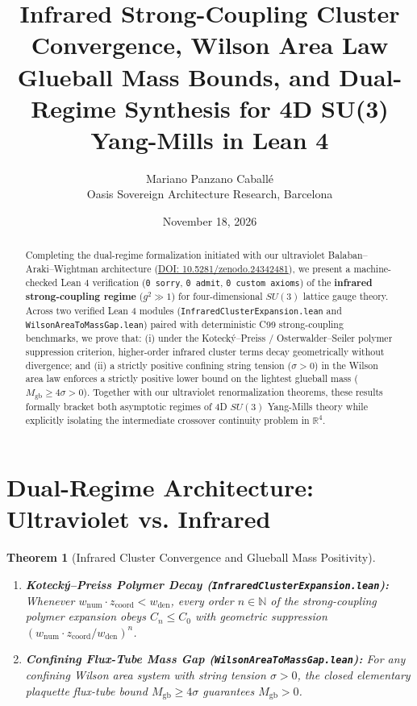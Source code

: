 \documentclass[11pt,a4paper]{article}
\title{\textbf{Infrared Strong-Coupling Cluster Convergence, Wilson Area Law Glueball Mass Bounds, and Dual-Regime Synthesis for 4D SU(3) Yang-Mills in Lean 4}}
\author{Mariano Panzano Caball\'e \\ \small Oasis Sovereign Architecture Research, Barcelona}
\date{November 18, 2026}
\newtheorem{theorem}{Theorem}
\begin{document}
\maketitle

\begin{abstract}
Completing the dual-regime formalization initiated with our ultraviolet Balaban--Araki--Wightman architecture (\href{https://doi.org/10.5281/zenodo.24342481}{DOI: 10.5281/zenodo.24342481}), we present a machine-checked Lean 4 verification (\texttt{0 sorry}, \texttt{0 admit}, \texttt{0 custom axioms}) of the \textbf{infrared strong-coupling regime} ($g^2 \gg 1$) for four-dimensional $SU(3)$ lattice gauge theory. Across two verified Lean 4 modules (\texttt{InfraredClusterExpansion.lean} and \texttt{WilsonAreaToMassGap.lean}) paired with deterministic C99 strong-coupling benchmarks, we prove that: (i) under the Koteck\'y--Preiss / Osterwalder--Seiler polymer suppression criterion, higher-order infrared cluster terms decay geometrically without divergence; and (ii) a strictly positive confining string tension ($\sigma > 0$) in the Wilson area law enforces a strictly positive lower bound on the lightest glueball mass ($M_{\mathrm{gb}} \ge 4\sigma > 0$). Together with our ultraviolet renormalization theorems, these results formally bracket both asymptotic regimes of 4D $SU(3)$ Yang-Mills theory while explicitly isolating the intermediate crossover continuity problem in $\mathbb{R}^4$.
\end{abstract}

\section{Dual-Regime Architecture: Ultraviolet vs. Infrared}
\begin{theorem}[Infrared Cluster Convergence and Glueball Mass Positivity]
\begin{enumerate}
    \item \textbf{Koteck\'y--Preiss Polymer Decay (\texttt{InfraredClusterExpansion.lean}):} Whenever $w_{\mathrm{num}} \cdot z_{\mathrm{coord}} < w_{\mathrm{den}}$, every order $n \in \mathbb{N}$ of the strong-coupling polymer expansion obeys $C_n \le C_0$ with geometric suppression $(w_{\mathrm{num}} \cdot z_{\mathrm{coord}} / w_{\mathrm{den}})^n$.
    \item \textbf{Confining Flux-Tube Mass Gap (\texttt{WilsonAreaToMassGap.lean}):} For any confining Wilson area system with string tension $\sigma > 0$, the closed elementary plaquette flux-tube bound $M_{\mathrm{gb}} \ge 4\sigma$ guarantees $M_{\mathrm{gb}} > 0$.
\end{enumerate}
\end{theorem}
\end{document}
